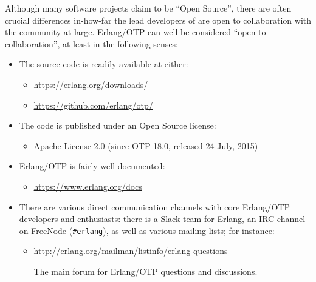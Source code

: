 Although many software projects claim to be ``Open Source'', there are
often crucial differences in-how-far the lead developers of are open
to collaboration with the community at large. Erlang/OTP can well be
considered ``open to collaboration'', at least in the following
senses:

\begin{itemize}

\item The source code is readily available at either:

\begin{itemize}

\item \url{https://erlang.org/downloads/}

\item \url{https://github.com/erlang/otp/}

\end{itemize}

\item The code is published under an Open Source license:

\begin{itemize}

\item Apache License 2.0 (since OTP 18.0, released 24 July, 2015)

\end{itemize}

\item Erlang/OTP is fairly well-documented:

\begin{itemize}

\item \url{https://www.erlang.org/docs}

\end{itemize}

\item There are various direct communication channels with core
Erlang/OTP developers and enthusiasts: there is a Slack team for
Erlang, an IRC channel on FreeNode (\texttt{\#erlang}), as well as
various mailing lists; for instance:

\begin{itemize}

\item \url{http://erlang.org/mailman/listinfo/erlang-questions}

The main forum for Erlang/OTP questions and discussions.

\end{itemize}


\end{itemize}
